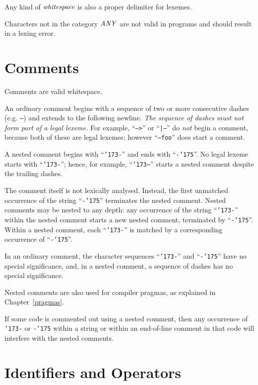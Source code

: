 Any kind of \mbox{$\it whitespace$} is also a proper delimiter for lexemes.

Characters not in the category \mbox{$\it ANY$} are not valid
in \Haskell{} programs and should result in a lexing error.

\section{Comments}

Comments are valid whitespace.

An ordinary comment begins with a sequence of
two or more consecutive dashes (e.g. \mbox{\tt --}) and extends to the following newline.
{\em The sequence of dashes must not form part of a legal lexeme.}
For example, ``\mbox{\tt -->}'' or ``\mbox{\tt |--}'' do {\em not} begin
a comment, because both of these are legal lexemes; however ``\mbox{\tt --foo}''
does start a comment.

A nested comment begins with ``\mbox{\tt {\char'173}-}'' 
and ends with ``\mbox{\tt -{\char'175}}''.  No legal lexeme starts with ``\mbox{\tt {\char'173}-}''; 
hence, for example, ``\mbox{\tt {\char'173}---}'' starts a nested comment despite the trailing dashes.

The comment itself is not lexically analysed.  Instead, the first
unmatched occurrence of the string ``\mbox{\tt -{\char'175}}'' terminates the nested
comment.  Nested comments may be nested to any depth: any occurrence
of the string ``\mbox{\tt {\char'173}-}'' within the nested comment starts a new nested
comment, terminated by ``\mbox{\tt -{\char'175}}''.  Within a nested comment, each
``\mbox{\tt {\char'173}-}'' is matched by a corresponding occurrence of ``\mbox{\tt -{\char'175}}''.

In an ordinary comment, the character
sequences ``\mbox{\tt {\char'173}-}'' and ``\mbox{\tt -{\char'175}}'' have no special significance, and, in a
nested comment, a sequence of dashes has no special significance.

Nested comments are also used for compiler pragmas, as explained in
Chapter~\ref{pragmas}.

If some code is commented out using a nested comment, then any
occurrence of \mbox{\tt {\char'173}-} or \mbox{\tt -{\char'175}} within a string or within an end-of-line
comment in that code will interfere with the nested comments.

\section{Identifiers and Operators}
\label{ids}

